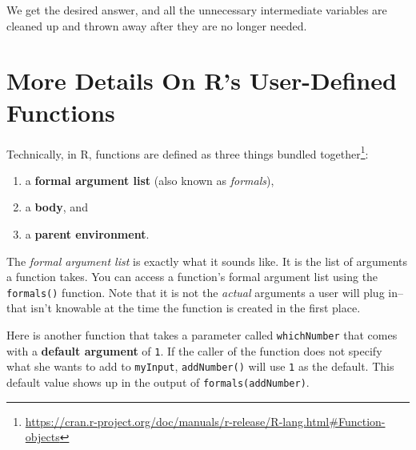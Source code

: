 \documentclass[
  12pt,
  krantz2]{krantz}
\makeatletter
\newenvironment{Shaded}{\begin{snugshade}}{\end{snugshade}}
\newcommand{\AttributeTok}[1]{\textcolor[rgb]{0.61,0.61,0.61}{#1}}
\newcommand{\CommentTok}[1]{\textcolor[rgb]{0.37,0.37,0.37}{\textit{#1}}}
\newcommand{\ControlFlowTok}[1]{\textcolor[rgb]{0.27,0.27,0.27}{\textbf{#1}}}
\newcommand{\DecValTok}[1]{\textcolor[rgb]{0.06,0.06,0.06}{#1}}
\newcommand{\DocumentationTok}[1]{\textcolor[rgb]{0.37,0.37,0.37}{\textbf{\textit{#1}}}}
\newcommand{\FunctionTok}[1]{\textcolor[rgb]{0,0,0}{#1}}
\newcommand{\NormalTok}[1]{#1}
\newcommand{\OtherTok}[1]{\textcolor[rgb]{0.37,0.37,0.37}{#1}}
\newcommand{\SpecialCharTok}[1]{\textcolor[rgb]{0,0,0}{#1}}
\providecommand{\tightlist}{%
  \setlength{\itemsep}{0pt}\setlength{\parskip}{0pt}}
\renewcommand{\href}[2]{#2\footnote{\url{#1}}}
\newenvironment{kframe}{%
\medskip{}
\setlength{\fboxsep}{.8em}
 \def\at@end@of@kframe{}%
 \ifinner\ifhmode%
  \def\at@end@of@kframe{\end{minipage}}%
  \begin{minipage}{\columnwidth}%
 \fi\fi%
 \def\FrameCommand##1{\hskip\@totalleftmargin \hskip-\fboxsep
 \colorbox{shadecolor}{##1}\hskip-\fboxsep
     \hskip-\linewidth \hskip-\@totalleftmargin \hskip\columnwidth}%
 \MakeFramed {\advance\hsize-\width
   \@totalleftmargin\z@ \linewidth\hsize
   \@setminipage}}%
 {\par\unskip\endMakeFramed%
 \at@end@of@kframe}
\renewenvironment{Shaded}{\begin{kframe}}{\end{kframe}}
\makeatother
\begin{document}
We get the desired answer, and all the unnecessary intermediate variables are cleaned up and thrown away after they are no longer needed.

\hypertarget{more-details-on-rs-user-defined-functions}{%
\section{More Details On R's User-Defined Functions}\label{more-details-on-rs-user-defined-functions}}

Technically, in R, functions are \href{https://cran.r-project.org/doc/manuals/r-release/R-lang.html\#Function-objects}{defined as three things bundled together}:

\begin{enumerate}
\def\labelenumi{\arabic{enumi}.}
\tightlist
\item
  a \textbf{formal argument list} (also known as \emph{formals}),
\item
  a \textbf{body}, and
\item
  a \textbf{parent environment}.
\end{enumerate}

The \emph{formal argument list} is exactly what it sounds like. It is the list of arguments a function takes. You can access a function's formal argument list using the \texttt{formals()} function. Note that it is not the \emph{actual} arguments a user will plug in--that isn't knowable at the time the function is created in the first place.

Here is another function that takes a parameter called \texttt{whichNumber} that comes with a \textbf{default argument} of \texttt{1}. If the caller of the function does not specify what she wants to add to \texttt{myInput}, \texttt{addNumber()} will use \texttt{1} as the default. This default value shows up in the output of \texttt{formals(addNumber)}.

\begin{Shaded}
\end{Shaded}
\end{document}
